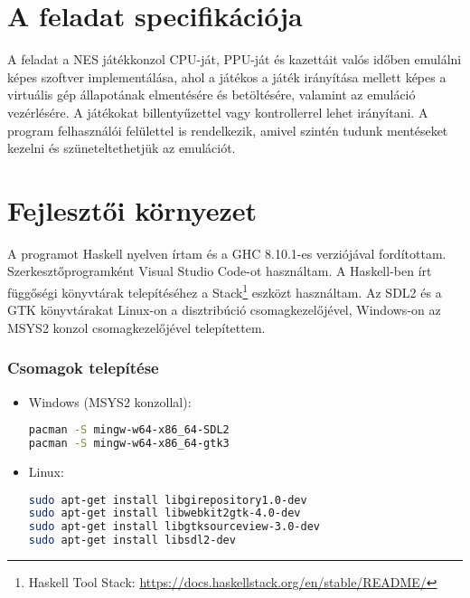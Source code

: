 \section{A feladat specifikációja}

A feladat a NES játékkonzol CPU-ját, PPU-ját és kazettáit valós időben emulálni képes szoftver implementálása, ahol a játékos a játék irányítása mellett képes a virtuális gép állapotának elmentésére és betöltésére, valamint az emuláció vezérlésére. A játékokat billentyűzettel vagy kontrollerrel lehet irányítani. A program felhasználói felülettel is rendelkezik, amivel szintén tudunk mentéseket kezelni és szüneteltethetjük az emulációt.

\section{Fejlesztői környezet}

A programot Haskell nyelven írtam és a GHC 8.10.1-es verziójával fordítottam. Szerkesztőprogramként Visual Studio Code-ot használtam. A Haskell-ben írt függőségi könyvtárak telepítéséhez a Stack\footnote{Haskell Tool Stack: \url{https://docs.haskellstack.org/en/stable/README/}} eszközt használtam.
Az SDL2 és a GTK könyvtárakat Linux-on a disztribúció csomagkezelőjével, Windows-on az MSYS2 konzol csomagkezelőjével telepítettem. 
\clearpage
\subsubsection{Csomagok telepítése}
\begin{itemize}
	\item Windows (MSYS2 konzollal):
\begin{lstlisting}[language=bash]
pacman -S mingw-w64-x86_64-SDL2
pacman -S mingw-w64-x86_64-gtk3
\end{lstlisting}
	\item Linux:
\begin{lstlisting}[language=bash]
sudo apt-get install libgirepository1.0-dev
sudo apt-get install libwebkit2gtk-4.0-dev
sudo apt-get install libgtksourceview-3.0-dev
sudo apt-get install libsdl2-dev
\end{lstlisting}
\end{itemize}

